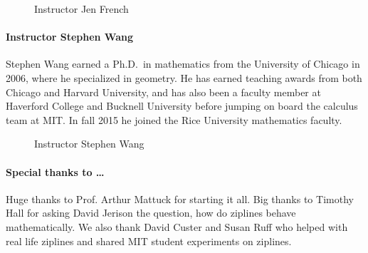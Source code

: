 \documentclass[pdftex, brazil, 12pt, twoside]{article}
\begin{document}
\begin{figure}[H]
  \begin{center}
    \caption{Instructor Jen French }
    \label{fig:jen}
  \end{center}
\end{figure}

\paragraph{Instructor Stephen Wang}
Stephen Wang earned a Ph.D.\ in mathematics from the University of Chicago in 2006, where he specialized in geometry. He has earned teaching awards from both Chicago and Harvard University, and has also been a faculty member at Haverford College and Bucknell University before jumping on board the calculus team at MIT. In fall 2015 he joined the Rice University mathematics faculty.

\begin{figure}[H]
  \begin{center}
    \caption{Instructor Stephen Wang}
    \label{fig:wang}
  \end{center}
\end{figure}

\paragraph{Special thanks to \ldots}
Huge thanks to Prof. Arthur Mattuck for starting it all. Big thanks to Timothy Hall for asking David Jerison the question, how do ziplines behave mathematically. We also thank David Custer and Susan Ruff who helped with real life ziplines and shared MIT student experiments on ziplines.
\end{document}
